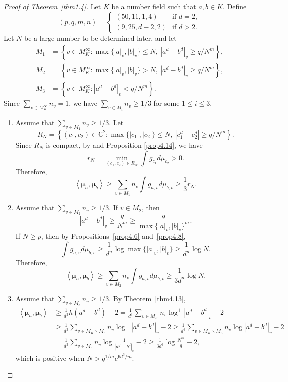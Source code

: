 \documentclass[11pt]{amsart}
\numberwithin{equation}{section}
\theoremstyle{plain}
\theoremstyle{definition}
\theoremstyle{remark}
\newcommand{\C}{\mathbb C}
\begin{document}
\begin{proof}[Proof of Theorem~\ref{thm1.4}]
Let $K$ be a number field such that $a,b\in K$. Define
\[
(p,q,m,n)=\begin{cases}
(50,11,1,4) & \text{if }d=2,\\
(9,25,d-2,2) & \text{if }d>2.
\end{cases}
\]
Let $N$ be a large number to be determined later, and let
\begin{align*}
M_{1} & =\left\{v\in M_{K}^{\infty}:\max\{|a|_{v},|b|_{v}\}\leq N,\ \left|a^{d}-b^{d}\right|_{v}\geq q/N^{m}\right\},\\
M_{2} & =\left\{v\in M_{K}^{\infty}:\max\{|a|_{v},|b|_{v}\}>N,\ \left|a^{d}-b^{d}\right|_{v}\geq q/N^{m}\right\},\\
M_{3} & =\left\{v\in M_{K}^{\infty}:\left|a^{d}-b^{d}\right|_{v}<q/N^{m}\right\}.
\end{align*}
Since $\sum_{v\in M_{K}^{\infty}}n_{v}=1$, we have $\sum_{v\in M_{i}}n_{v}\geq1/3$
for some $1\leq i\leq3$.

\begin{enumerate}[wide]
\item Assume that $\sum_{v\in M_{1}}n_{v}\geq1/3$. Let
\[
R_{N}=\left\{(c_{1},c_{2})\in\C^{2}:\max\{|c_{1}|,|c_{2}|\}\leq N,\ \left|c_{1}^{d}-c_{2}^{d}\right|\geq q/N^{m}\right\}.
\]
Since $R_{N}$ is compact, by \cite[Lemma 3.4]{BD1} and Proposition
\ref{prop4.14}, we have 
\[
r_{N}=\min_{(c_{1},c_{2})\in R_{N}}\int g_{c_{1}}d\mu_{c_{2}}>0.
\]
Therefore,
\[
\left\langle \boldsymbol{\mu}_{a},\boldsymbol{\mu}_{b}\right\rangle \geq\sum_{v\in M_{1}}n_{v}\int g_{a,v}d\mu_{b,v}\geq\frac{1}{3}r_{N}.
\]

\item Assume that $\sum_{v\in M_{2}}n_{v}\geq1/3$. If $v\in M_{2}$,
then
\[
|a^{d}-b^{d}|_{v}\geq\frac{q}{N^{m}}\geq\frac{q}{\max\{|a|_{v},|b|_{v}\}^{m}}.
\]
If $N\geq p$, then by Propositions~\ref{prop4.6} and~\ref{prop4.8},
\[
\int g_{a,v}d\mu_{b,v}\geq\frac{1}{d^{n}}\log\max\{|a|_{v},|b|_{v}\}\geq\frac{1}{d^{n}}\log N.
\]
Therefore,
\[
\left\langle \boldsymbol{\mu}_{a},\boldsymbol{\mu}_{b}\right\rangle \geq\sum_{v\in M_{2}}n_{v}\int g_{a,v}d\mu_{b,v}\geq\frac{1}{3d^{n}}\log N.
\]

\item Assume that $\sum_{v\in M_{3}}n_{v}\geq1/3$. By Theorem~\ref{thm4.13},
\allowdisplaybreaks
  \begin{align*}
\left\langle \boldsymbol{\mu}_{a},\boldsymbol{\mu}_{b}\right\rangle  & \geq\frac{1}{d^{3}}h\left(a^{d}-b^{d}\right)-2=\frac{1}{d^{3}}\sum_{v\in M_{K}}n_{v}\log^{+}\left|a^{d}-b^{d}\right|_{v}-2\\
 & \geq\frac{1}{d^{3}}\sum_{v\in M_{K}\backslash M_{3}}n_{v}\log^{+}\left|a^{d}-b^{d}\right|_{v}-2\geq\frac{1}{d^{3}}\sum_{v\in M_{K}\backslash M_{3}}n_{v}\log\left|a^{d}-b^{d}\right|_{v}-2\\
 & =\frac{1}{d^{3}}\sum_{v\in M_{3}}n_{v}\log\frac{1}{\left|a^{d}-b^{d}\right|_{v}}-2\geq\frac{1}{3d^{3}}\log\frac{N^{m}}{q}-2,
\end{align*}
  which is positive when $N>q^{1/m}e^{6d^{3}/m}$.\hfill\qedhere
  \end{enumerate}
\end{proof}
\end{document}
